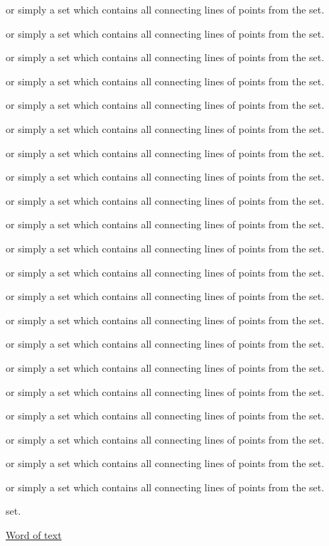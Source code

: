 \documentclass{article}
\begin{document}
or simply a set which contains all connecting lines of points from the
set.

or simply a set which contains all connecting lines of points from the
set.

or simply a set which contains all connecting lines of points from the
set.

or simply a set which contains all connecting lines of points from the
set.

or simply a set which contains all connecting lines of points from the
set.

or simply a set which contains all connecting lines of points from the
set.

or simply a set which contains all connecting lines of points from the
set.

or simply a set which contains all connecting lines of points from the
set.

or simply a set which contains all connecting lines of points from the
set.

or simply a set which contains all connecting lines of points from the
set.

or simply a set which contains all connecting lines of points from the
set.

or simply a set which contains all connecting lines of points from the
set.

or simply a set which contains all connecting lines of points from the
set.

or simply a set which contains all connecting lines of points from the
set.

or simply a set which contains all connecting lines of points from the
set.

or simply a set which contains all connecting lines of points from the
set.

or simply a set which contains all connecting lines of points from the
set.

or simply a set which contains all connecting lines of points from the
set.

or simply a set which contains all connecting lines of points from the
set.

or simply a set which contains all connecting lines of points from the
set.

or simply a set which contains all connecting lines of points from the
set.

set.

\hyperref[d1c9db1]{Word of text}
\end{document}
